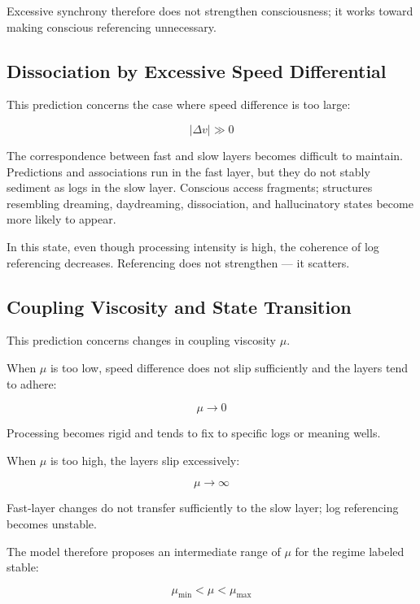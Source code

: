 Excessive synchrony therefore does not strengthen consciousness; it works toward making conscious referencing unnecessary.

\subsection{Dissociation by Excessive Speed Differential}


This prediction concerns the case where speed difference is too large:

\begin{equation}
|\Delta v| \gg 0
\end{equation}

The correspondence between fast and slow layers becomes difficult to maintain. Predictions and associations run in the fast layer, but they do not stably sediment as logs in the slow layer. Conscious access fragments; structures resembling dreaming, daydreaming, dissociation, and hallucinatory states become more likely to appear.

In this state, even though processing intensity is high, the coherence of log referencing decreases. Referencing does not strengthen — it scatters.

\subsection{Coupling Viscosity and State Transition}


This prediction concerns changes in coupling viscosity $\mu$.

When $\mu$ is too low, speed difference does not slip sufficiently and the layers tend to adhere:

\begin{equation}
\mu \rightarrow 0
\end{equation}

Processing becomes rigid and tends to fix to specific logs or meaning wells.

When $\mu$ is too high, the layers slip excessively:

\begin{equation}
\mu \rightarrow \infty
\end{equation}

Fast-layer changes do not transfer sufficiently to the slow layer; log referencing becomes unstable.

The model therefore proposes an intermediate range of $\mu$ for the regime labeled stable:

\begin{equation}
\mu_{\min} < \mu < \mu_{\max}
\end{equation}

